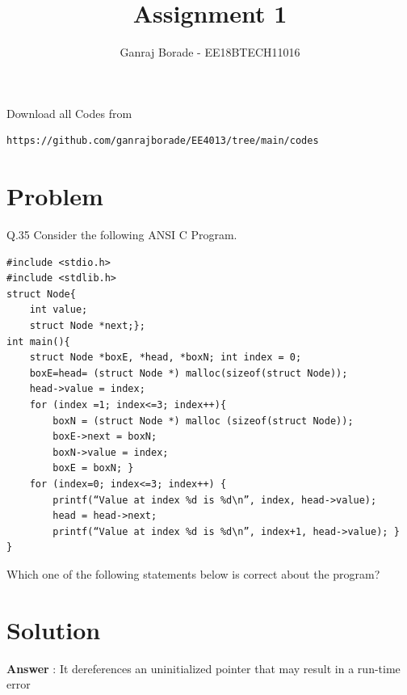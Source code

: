 \documentclass[journal,12pt,twocolumn]{IEEEtran}
\begin{document}
     \def\rightbox#1{\makebox[0in][r]{#1}}
     \def\centbox#1{\makebox[0in]{#1}}
     \def\topbox#1{\raisebox{-\baselineskip}[0in][0in]{#1}}
     \def\midbox#1{\raisebox{-0.5\baselineskip}[0in][0in]{#1}}
\vspace{3cm}
\title{Assignment 1}
\author{Ganraj Borade - EE18BTECH11016}
\maketitle
\newpage
\bigskip
\UseRawInputEncoding
\renewcommand{\thefigure}{\theenumi}
\renewcommand{\thetable}{\theenumi}
Download all Codes from 
%
\begin{lstlisting}
https://github.com/ganrajborade/EE4013/tree/main/codes
\end{lstlisting}

\section{Problem}
Q.35 Consider the following ANSI C Program.
\begin{lstlisting}
#include <stdio.h>
#include <stdlib.h>
struct Node{
	int value;
	struct Node *next;};
int main(){
    struct Node *boxE, *head, *boxN; int index = 0;
    boxE=head= (struct Node *) malloc(sizeof(struct Node));
    head->value = index;
    for (index =1; index<=3; index++){
	    boxN = (struct Node *) malloc (sizeof(struct Node));
	    boxE->next = boxN;
	    boxN->value = index;
	    boxE = boxN; }
    for (index=0; index<=3; index++) {
	    printf(“Value at index %d is %d\n”, index, head->value);
	    head = head->next;
	    printf(“Value at index %d is %d\n”, index+1, head->value); }
}
\end{lstlisting}
 Which one of the following statements below is correct about the program?

\section{Solution}
\textbf{Answer} : It dereferences an uninitialized pointer that may result in a run-time error
\newline
\end{document}
